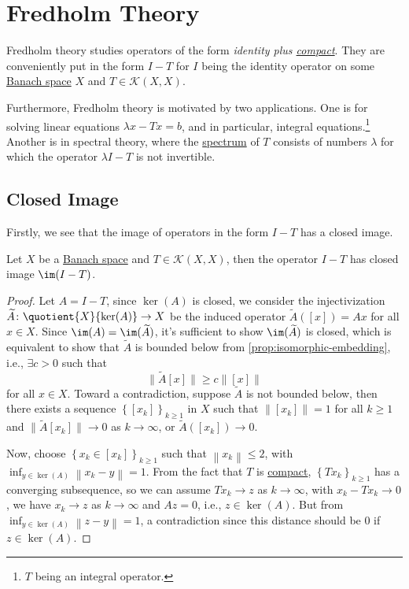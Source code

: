 \section{Fredholm Theory}
Fredholm theory studies operators of the form \emph{identity plus \hyperref[def:compact-op]{compact}}. They are conveniently put in the form \(I - T\) for \(I\) being the identity operator on some \hyperref[def:Banach-space]{Banach space} \(X\) and \(T\in \mathcal{K}(X, X)\).

Furthermore, Fredholm theory is motivated by two applications. One is for solving linear equations \(\lambda x - Tx = b\), and in particular, integral equations.\footnote{\(T\) being an integral operator.} Another is in spectral theory, where the \hyperref[def:spectrum-point]{spectrum} of \(T\) consists of numbers \(\lambda \) for which the operator \(\lambda I - T\) is not invertible.
\subsection{Closed Image}
Firstly, we see that the image of operators in the form \(I - T\) has a closed image.

\begin{lemma}\label{lma:Fredholm-closed-image}
	Let \(X\) be a \hyperref[def:Banach-space]{Banach space} and \(T\in \mathcal{K}(X, X)\), then the operator \(I-T\) has closed image \(\im(I-T)\).
\end{lemma}
\begin{proof}
	Let \(A=I-T\), since \(\ker (A)\) is closed, we consider the injectivization \(\widetilde{A} \colon \quotient{X}{\ker(A)}\to X\) be the induced operator \(\widetilde{A} ([x])=Ax\) for all \(x\in X\). Since \(\im(A) = \im(\widetilde{A} )\), it's sufficient to show \(\im(\widetilde{A} )\) is closed, which is equivalent to show that \(\widetilde{A} \) is bounded below from \autoref{prop:isomorphic-embedding}, i.e., \(\exists c>0\) such that
	\[
		\lVert \widetilde{A} [x]\rVert \geq c\left\lVert [x]\right\rVert
	\]
	for all \(x\in X\). Toward a contradiction, suppose \(\widetilde{A} \) is not bounded below, then there exists a sequence \(\left\{ [x_k] \right\} _{k\geq 1}\) in \(X\) such that \(\left\lVert [x_{k} ]\right\rVert = 1\) for all \(k\geq 1\) and \(\lVert \widetilde{A} [x_k] \rVert \to 0\) as \(k \to \infty \), or \( \widetilde{A} ([x_{k} ])\to 0\).

	Now, choose \(\left\{ x_{k} \in [x_k] \right\}_{k\geq 1} \) such that \(\left\lVert x_{k} \right\rVert \leq 2\), with \(\inf_{y\in \ker(A)} \left\lVert x_{k} -y\right\rVert=1 \). From the fact that \(T\) is \hyperref[def:compact-op]{compact}, \(\left\{ Tx_{k}  \right\}_{k\geq 1} \) has a converging subsequence, so we can assume \(Tx_{k} \to z\) as \(k\to \infty \), with \(x_{k} - Tx_{k} \to 0\), we have \(x_{k} \to z\) as \(k \to \infty \) and \(Az = 0\), i.e., \(z\in \ker(A)\). But from \(\inf _{y\in \ker(A)} \left\lVert z - y\right\rVert = 1\), a contradiction since this distance should be \(0\) if \(z\in \ker(A)\).
\end{proof}

